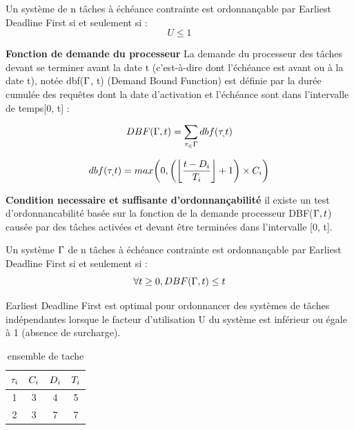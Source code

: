 \begin{theoreme}[\cite{LL73}]
 Un système de n tâches à échéance contrainte est ordonnançable par Earliest Deadline First si et seulement si :
 \begin{equation}
 U \leq 1
 \end{equation}
\end{theoreme}

\textbf{Fonction de demande du processeur}
La demande du processeur des tâches devant se terminer avant la date t (c’est-à-dire dont l’échéance
est avant ou à la date t), notée dbf($\Gamma$, t) (Demand Bound Function) est définie par la durée cumulée
des requêtes dont la date d’activation et l’échéance sont dans l’intervalle de temps[0, t] :

\begin{equation}
DBF(\Gamma,t) = \sum_{\tau_ \in \Gamma}dbf(\tau_,t)
\end{equation}

\begin{equation}
dbf(\tau_,t) = max \bigg( 0,\bigg( \bigg\lfloor \frac{t - D_{i}}{T_{i}} \bigg\rfloor + 1 \bigg) \times C_{i} \bigg)
\end{equation}

\textbf{Condition necessaire et suffisante d'ordonnançabilité}\cite{BHR93} il existe un test d’ordonnancabilité basée sur la fonction
de la demande processeur DBF($\Gamma,t$) causée par des tâches activées et devant être terminées dans l’intervalle [0, t].

\begin{theoreme}
Un système $\Gamma$ de n tâches à échéance contrainte est ordonnançable par Earliest Deadline First si et seulement si :
\begin{equation}
\forall t \geq 0 , DBF(\Gamma,t) \leq t 
\end{equation}
\end{theoreme}

\begin{theoreme}
Earliest Deadline First est optimal pour ordonnancer des systèmes de tâches indépendantes lorsque le facteur d'utilisation U du système est inférieur ou égale à 1 (absence de surcharge).
\end{theoreme}

\begin{table}[h]
\begin{center}
\begin{tabular}{|c|c|c|c|}
 \hline$\tau_{i}$ & $C_{i}$ & $D_{i}$ & $T_{i}$\\ 
 \hline1 & 3 & 4 & 5\\ 
 \hline2 & 3 & 7 & 7 \\  
 \hline
 \end{tabular}
\end{center}
\caption{ensemble de tache } \label{tab:exempleEDF}
\end{table}
\vspace{1cm}


